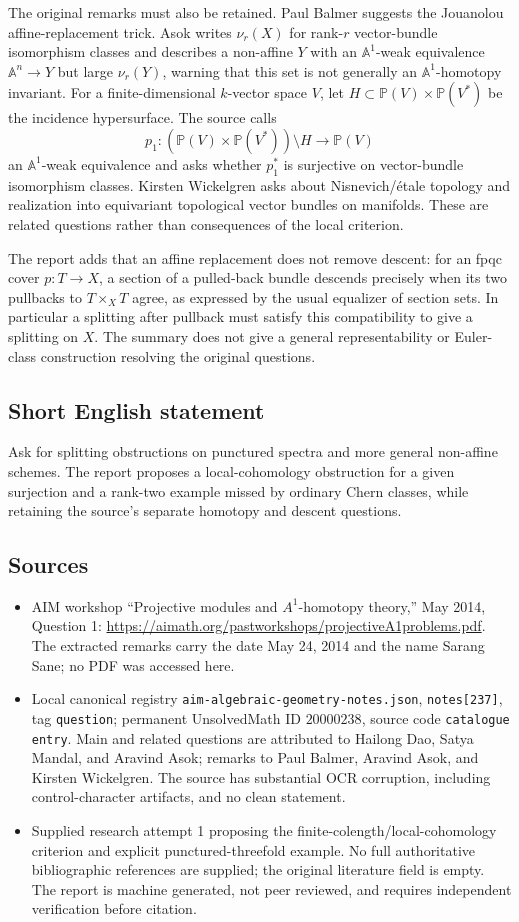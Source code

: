 \documentclass[11pt]{article}
\newcommand{\A}{\mathbb{A}}
\newcommand{\PP}{\mathbb{P}}
\begin{document}
The original remarks must also be retained. Paul Balmer suggests the Jouanolou affine-replacement trick. Asok writes \(\nu_r(X)\) for rank-\(r\) vector-bundle isomorphism classes and describes a non-affine \(Y\) with an \(\A^1\)-weak equivalence \(\A^n\to Y\) but large \(\nu_r(Y)\), warning that this set is not generally an \(\A^1\)-homotopy invariant. For a finite-dimensional \(k\)-vector space \(V\), let \(H\subset\PP(V)\times\PP(V^*)\) be the incidence hypersurface. The source calls
\[
p_1:(\PP(V)\times\PP(V^*))\setminus H\longrightarrow\PP(V)
\]
an \(\A^1\)-weak equivalence and asks whether \(p_1^*\) is surjective on vector-bundle isomorphism classes. Kirsten Wickelgren asks about Nisnevich/\'etale topology and realization into equivariant topological vector bundles on manifolds. These are related questions rather than consequences of the local criterion.

The report adds that an affine replacement does not remove descent: for an fpqc cover \(p:T\to X\), a section of a pulled-back bundle descends precisely when its two pullbacks to \(T\times_XT\) agree, as expressed by the usual equalizer of section sets. In particular a splitting after pullback must satisfy this compatibility to give a splitting on \(X\). The summary does not give a general representability or Euler-class construction resolving the original questions.
\subsection{Short English statement}
Ask for splitting obstructions on punctured spectra and more general non-affine schemes. The report proposes a local-cohomology obstruction for a given surjection and a rank-two example missed by ordinary Chern classes, while retaining the source's separate homotopy and descent questions.
\subsection{Sources}
\begin{itemize}
\item AIM workshop ``Projective modules and \(A^1\)-homotopy theory,'' May 2014, Question 1: \url{https://aimath.org/pastworkshops/projectiveA1problems.pdf}. The extracted remarks carry the date May 24, 2014 and the name Sarang Sane; no PDF was accessed here.
\item Local canonical registry \texttt{aim-algebraic-geometry-notes.json}, \texttt{notes[237]}, tag \texttt{question}; permanent UnsolvedMath ID \(20000238\), source code \texttt{catalogue entry}. Main and related questions are attributed to Hailong Dao, Satya Mandal, and Aravind Asok; remarks to Paul Balmer, Aravind Asok, and Kirsten Wickelgren. The source has substantial OCR corruption, including control-character artifacts, and no clean statement.
\item Supplied research attempt 1 proposing the finite-colength/local-cohomology criterion and explicit punctured-threefold example. No full authoritative bibliographic references are supplied; the original literature field is empty. The report is machine generated, not peer reviewed, and requires independent verification before citation.
\end{itemize}
\end{document}
